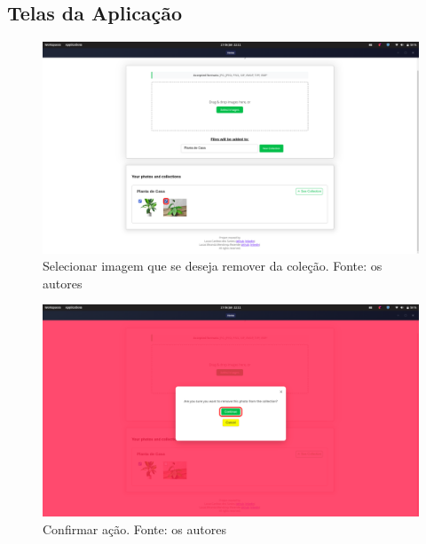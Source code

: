 \subsection{Telas da Aplicação}

\begin{figure}[H]
    \centering
    \includegraphics[width=1\textwidth]{../figures/screens/uc004/Screenshot from 2025-06-27 22-11-19.png}
    \caption{Selecionar imagem que se deseja remover da coleção. Fonte: os autores}
    \label{fig:uc004-screen1}
\end{figure}

\begin{figure}[H]
    \centering
    \includegraphics[width=1\textwidth]{../figures/screens/uc004/Screenshot from 2025-06-27 22-11-24.png}
    \caption{Confirmar ação. Fonte: os autores}
    \label{fig:uc004-screen2}
\end{figure}

